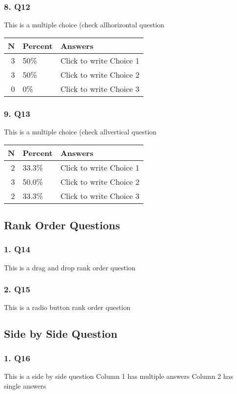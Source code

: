 \documentclass{article}\usepackage[]{graphicx}\usepackage[]{color}
\begin{document}
\hfill \break \hfill \break
\subsubsection*{8. Q12}
This is a multiple choice (check allhorizontal question

\begin{tabular}{r|l|l}
\hline
N & Percent & Answers\\
\hline
3 & 50\% & Click to write Choice 1\\
\hline
3 & 50\% & Click to write Choice 2\\
\hline
0 & 0\% & Click to write Choice 3\\
\hline
\end{tabular}


\hfill \break \hfill \break
\subsubsection*{9. Q13}
This is a multiple choice (check allvertical question

\begin{tabular}{r|l|l}
\hline
N & Percent & Answers\\
\hline
2 & 33.3\% & Click to write Choice 1\\
\hline
3 & 50.0\% & Click to write Choice 2\\
\hline
2 & 33.3\% & Click to write Choice 3\\
\hline
\end{tabular}


\hfill \break \hfill \break
\subsection*{Rank Order Questions}
\subsubsection*{1. Q14}
This is a drag and drop rank order question

\hfill \break \hfill \break
\subsubsection*{2. Q15}
This is a radio button rank order question

\hfill \break \hfill \break
\subsection*{Side by Side Question}
\subsubsection*{1. Q16}
This is a side by side question Column 1 has multiple answers Column 2 has single answers

\hfill \break \hfill \break
\end{document}
